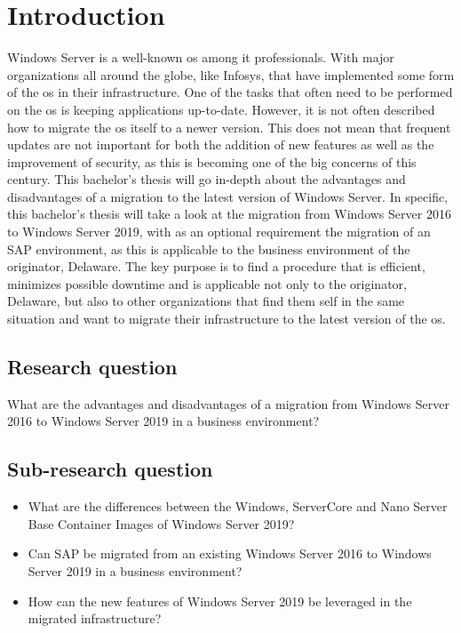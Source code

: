 \section{Introduction}\label{sec:introduction}
Windows Server is a well-known \acrfull{os} among \acrfull{it} professionals. With major organizations all around the globe, like Infosys, that have implemented some form of the \acrshort{os} in their infrastructure. \autocite{S.Chauhan2015}
One of the tasks that often need to be performed on the \acrshort{os} is keeping applications up-to-date. However, it is not often described how to migrate the \acrshort{os} itself to a newer version.  
This does not mean that frequent updates are not important for both the addition of new features as well as the improvement of security, as this is becoming one of the big concerns of this century. 
This bachelor's thesis will go in-depth about the advantages and disadvantages of a migration to the latest version of Windows Server. In specific, this bachelor's thesis will take a look at the migration from Windows Server 2016 to Windows Server 2019, with as an optional requirement the migration of an SAP environment, as this is applicable to the business environment of the originator, Delaware.
The key purpose is to find a procedure that is efficient, minimizes possible downtime and is applicable not only to the originator, Delaware, but also to other organizations that find them self in the same situation and want to migrate their infrastructure to the latest version of the \acrshort{os}.
\subsection{Research question}
What are the advantages and disadvantages of a migration from Windows Server 2016 to Windows Server 2019 in a business environment?
\subsection{Sub-research question}
\begin{itemize}
	\item What are the differences between the Windows, ServerCore and Nano Server Base Container Images of Windows Server 2019?
	\item Can SAP be migrated from an existing Windows Server 2016 to Windows Server 2019 in a business environment?
	\item How can the new features of Windows Server 2019 be leveraged in the migrated infrastructure? 
\end{itemize}
